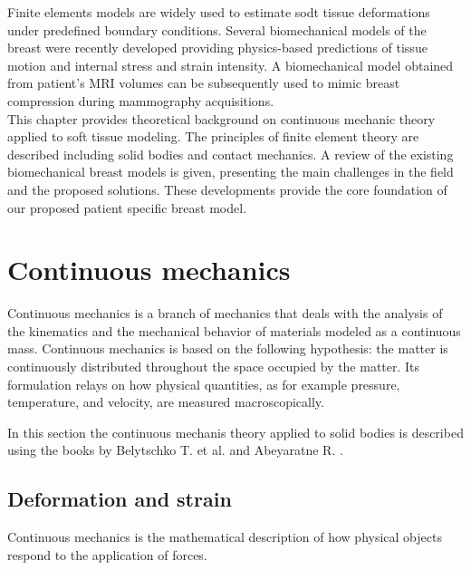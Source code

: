 

Finite elements models are widely used to estimate sodt tissue deformations under predefined boundary conditions. Several biomechanical models of the breast were recently developed providing physics-based predictions of tissue motion and internal stress and strain intensity. A biomechanical model obtained from patient's MRI volumes can be subsequently used to mimic breast compression during mammography acquisitions.\\


This chapter provides theoretical background on continuous mechanic theory applied to soft tissue modeling. The principles of finite element theory are described including solid bodies and contact mechanics. A review of the existing biomechanical breast models is given, presenting the main challenges in the field and the proposed solutions. These developments provide the core foundation of our proposed  patient specific breast model. 
      
\clearpage
\section{Continuous mechanics}
\label{section:continuousmechanics}
Continuous mechanics is a branch of mechanics that deals with the analysis of the kinematics and the mechanical behavior of materials modeled as a continuous mass. Continuous mechanics is based on the following hypothesis: the matter is continuously distributed throughout the space occupied by the matter. Its formulation relays on how physical quantities, as for example pressure, temperature, and velocity, are measured macroscopically.

In this section the continuous mechanis theory applied to solid bodies is described using the books by Belytschko T. et al. \citep{belytschko_nonlinear_2013} and Abeyaratne R. \citep{abeyaratne_continuum_2012}.
\subsection{Deformation and strain}\label{subsection:defromationandstrain}
Continuous mechanics is the mathematical description of how physical objects respond to the application of forces.


